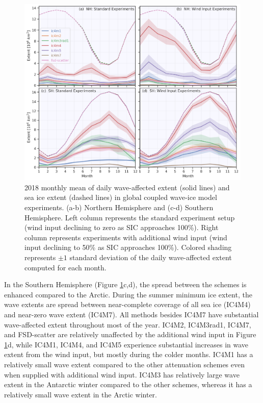 \documentclass [11pt, proquest] {uwthesis}[2020/02/24]
\begin{document}
\begin{figure}
    \noindent\includegraphics[width=1.0\textwidth]{modelwave_03.png}
    \caption{2018 monthly mean of daily wave-affected extent (solid lines) and sea ice extent (dashed lines) in global coupled wave-ice model experiments. (a-b) Northern Hemisphere and (c-d) Southern Hemisphere. Left column represents the standard experiment setup (wind input declining to zero as SIC approaches 100\%). Right column represents experiments with additional wind input (wind input declining to 50\% as SIC approaches 100\%). Colored shading represents $\pm 1$ standard deviation of the daily wave-affected extent computed for each month.}
    \label{fig:model-wave}
\end{figure}

In the Southern Hemisphere (Figure \ref{fig:model-wave}c,d), the spread between the schemes is enhanced compared to the Arctic. During the summer minimum ice extent, the wave extents are spread between near-complete coverage of all sea ice (IC4M4) and near-zero wave extent (IC4M7). All methods besides IC4M7 have substantial wave-affected extent throughout most of the year. IC4M2, IC4M3rad1, IC4M7, and FSD-scatter are relatively unaffected by the additional wind input in Figure \ref{fig:model-wave}d, while IC4M1, IC4M4, and IC4M5 experience substantial increases in wave extent from the wind input, but mostly during the colder months. IC4M1 has a relatively small wave extent compared to the other attenuation schemes even when supplied with additional wind input. IC4M3 has relatively large wave extent in the Antarctic winter compared to the other schemes, whereas it has a relatively small wave extent in the Arctic winter.  
\end{document}
